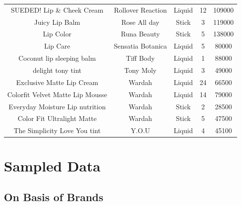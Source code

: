 \documentclass{article}
\begin{document}
\begin{longtable}{ccccc}
    SUEDED! Lip \& Cheek Cream              & Rollover Reaction & Liquid                       & 12              & 109000         \\
    Juicy Lip Balm                          & Rose All day      & Stick                        & 3               & 119000         \\
    Lip Color                               & Runa Beauty       & Stick                        & 5               & 138000         \\
    Lip Care                                & Sensatia Botanica & Liquid                       & 5               & 80000          \\
    Coconut lip sleeping balm               & Tiff Body         & Liquid                       & 1               & 88000          \\
    delight tony tint                       & Tony Moly         & Liquid                       & 3               & 49000          \\
    Exclusive Matte Lip Cream               & Wardah            & Liquid                       & 24              & 66500          \\
    Colorfit Velvet Matte Lip Mousse        & Wardah            & Liquid                       & 14              & 79000          \\
    Everyday Moisture Lip nutrition         & Wardah            & Stick                        & 2               & 28500          \\
    Color Fit Ultralight Matte              & Wardah            & Stick                        & 5               & 47500          \\
    The Simplicity Love You tint            & Y.O.U             & Liquid                       & 4               & 45100          \\
\end{longtable}

\restoregeometry %

\section{Sampled Data}
\subsection{On Basis of Brands}
\end{document}
